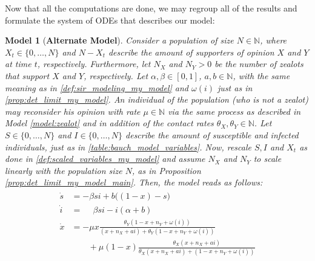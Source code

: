 \documentclass[12pt,a4paper,twoside]{article}
\newtheorem{model}{Model}[section]
\begin{document}
Now that all the computations are done, we may regroup all of the results and formulate the system of \acp{ODE} that describes our model:
\begin{model}[\textbf{Alternate Model}]\label{model:my_model}
Consider a population of size $N \in \mathbb{N}$, where $X_t \in \lbrace 0,\dots,N\rbrace$ and $N-X_t$ describe the amount of supporters of opinion $X$ and $Y$ at time $t$, respectively. Furthermore, let $N_X$ and $N_Y > 0$ be the number of zealots that support $X$ and $Y$, respectively. Let $\alpha,\beta \in \left[0,1\right]$, $a,b \in \mathbb{N}$, with the same meaning as in \eqref{def:sir_modeling_my_model} and $\omega\left(i\right)$ just as in \eqref{prop:det_limit_my_model}. An individual of the population (who is not a zealot) may reconsider his opinion with rate $\mu \in \mathbb{N}$ via the same process as described in Model \ref{model:zealot} and in addition of the contact rates $\theta_X, \theta_Y \in \mathbb{N}$. Let $S \in \lbrace 0,\dots,N\rbrace$ and $I \in  \lbrace 0,\dots,N\rbrace$ describe the amount of susceptible and infected individuals, just as in \eqref{table:bauch_model_variables}. Now, rescale $S,I$ and $X_t$ as done in \eqref{def:scaled_variables_my_model} and assume $N_X$ and $N_Y$ to scale linearly with the population size $N$, as in Proposition \ref{prop:det_limit_my_model_main}. Then, the model reads as follows:
	\begin{align}
	\begin{split}
	\dot{s} &= -\beta si + b\big(\left(1-x\right) - s\big)\\
	\dot{i} &= \phantom{+}\beta si - i\left(\alpha + b\right)\\
	\dot{x} &= -\mu x\frac{\theta_Y(1-x+n_Y+\omega\left(i\right))}{(x+n_X+ai) + \theta_Y(1-x+n_Y+\omega\left(i\right))}\\
	&\qquad+ \mu \left(1-x\right)\frac{\theta_X (x+ n_X+ ai)}{\theta_X (x + n_X + ai) + (1-x + n_Y + \omega\left(i\right))}
	\end{split}
	\end{align}
\end{model}
\end{document}
